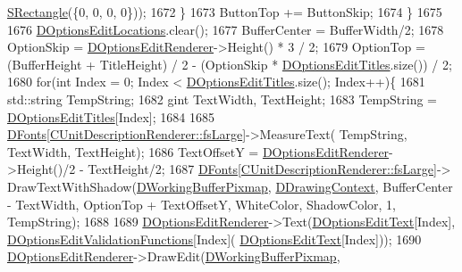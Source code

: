 \begin{DoxyCode}
      \hyperlink{structSRectangle}{SRectangle}(\{0, 0, 0, 0\}));
1672         \}
1673         ButtonTop += ButtonSkip;
1674     \}
1675     
1676     \hyperlink{classCApplicationData_ab4e6804c6e50cca45ab3c3071588da34}{DOptionsEditLocations}.clear();
1677     BufferCenter = BufferWidth/2;
1678     OptionSkip = \hyperlink{classCApplicationData_ad445b9a4d742414d09196de7cd8a5b26}{DOptionsEditRenderer}->Height() * 3 / 2;
1679     OptionTop = (BufferHeight + TitleHeight) / 2 - (OptionSkip * 
      \hyperlink{classCApplicationData_a7a322ef6b8c1db3e995c6b493230fd05}{DOptionsEditTitles}.size()) / 2;
1680     \textcolor{keywordflow}{for}(\textcolor{keywordtype}{int} Index = 0; Index < \hyperlink{classCApplicationData_a7a322ef6b8c1db3e995c6b493230fd05}{DOptionsEditTitles}.size(); Index++)\{
1681         std::string TempString;
1682         gint TextWidth, TextHeight;
1683         TempString = \hyperlink{classCApplicationData_a7a322ef6b8c1db3e995c6b493230fd05}{DOptionsEditTitles}[Index];
1684         
1685         \hyperlink{classCApplicationData_afde9247d0a3ea87393ec86dcdb1e8274}{DFonts}[\hyperlink{classCUnitDescriptionRenderer_a3ea4cd83b6dd9533ab3abb953a7da35aaf467097fe4f4811a5e2f1959c86e071d}{CUnitDescriptionRenderer::fsLarge}]->MeasureText(
      TempString, TextWidth, TextHeight);
1686         TextOffsetY = \hyperlink{classCApplicationData_ad445b9a4d742414d09196de7cd8a5b26}{DOptionsEditRenderer}->Height()/2 - TextHeight/2;
1687         \hyperlink{classCApplicationData_afde9247d0a3ea87393ec86dcdb1e8274}{DFonts}[\hyperlink{classCUnitDescriptionRenderer_a3ea4cd83b6dd9533ab3abb953a7da35aaf467097fe4f4811a5e2f1959c86e071d}{CUnitDescriptionRenderer::fsLarge}]->
      DrawTextWithShadow(\hyperlink{classCApplicationData_afa34cf2780f38dd28c0c811e69d60a97}{DWorkingBufferPixmap}, \hyperlink{classCApplicationData_aa6c5bea9bdcc64398e5a3f693661d37c}{DDrawingContext}, BufferCenter - TextWidth, 
      OptionTop + TextOffsetY, WhiteColor, ShadowColor, 1, TempString);
1688         
1689         \hyperlink{classCApplicationData_ad445b9a4d742414d09196de7cd8a5b26}{DOptionsEditRenderer}->Text(\hyperlink{classCApplicationData_a7044dc34cbd9d6776e8ef79eb12b5ce4}{DOptionsEditText}[Index], 
      \hyperlink{classCApplicationData_ab76fa444142de66fdb058f390e01112c}{DOptionsEditValidationFunctions}[Index](
      \hyperlink{classCApplicationData_a7044dc34cbd9d6776e8ef79eb12b5ce4}{DOptionsEditText}[Index]));
1690         \hyperlink{classCApplicationData_ad445b9a4d742414d09196de7cd8a5b26}{DOptionsEditRenderer}->DrawEdit(\hyperlink{classCApplicationData_afa34cf2780f38dd28c0c811e69d60a97}{DWorkingBufferPixmap}, 

\end{DoxyCode}
